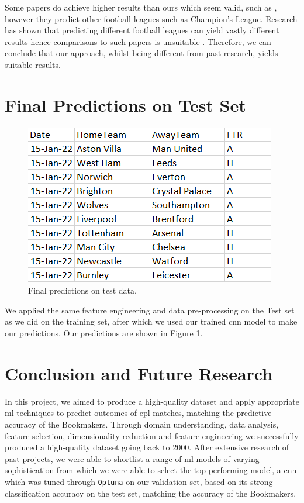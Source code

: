 \documentclass{article}
\newcommand{\sw}[1]{\texttt{#1}}
\begin{document}
Some papers do achieve higher results than ours which seem valid, such as \cite{hucaljuk2011predicting}, however they predict other football leagues such as Champion’s League. Research has shown that predicting different football leagues can yield vastly different results hence comparisons to such papers is unsuitable \cite{horvat2020use}. Therefore, we can conclude that our approach, whilst being different from past research, yields suitable results. 

\section{Final Predictions on Test Set}
\label{finalpred}

\vspace{-1em}
\begin{figure}[!htb]
    \centering
    \includegraphics[width=0.45\linewidth]{Images/Figure 8.png}
    \caption{Final predictions on test data.}
    \label{fig:predictions}
\end{figure}

We applied the same feature engineering and data pre-processing on the Test set as we did on the training set, after which we used our trained \gls{cnn} model to make our predictions. Our predictions are shown in Figure \ref{fig:predictions}.

\section{Conclusion and Future Research}
\label{conclusions}

In this project, we aimed to produce a high-quality dataset and apply appropriate \gls{ml} techniques to predict outcomes of \gls{epl} matches, matching the predictive accuracy of the Bookmakers. Through domain understanding, data analysis, feature selection, dimensionality reduction and feature engineering we successfully produced a high-quality dataset going back to 2000. After extensive research of past projects, we were able to shortlist a range of \gls{ml} models of varying sophistication from which we were able to select the top performing model, a \gls{cnn} which was tuned through \sw{Optuna} on our validation set, based on its strong classification accuracy on the test set, matching the accuracy of the Bookmakers.  
\end{document}
